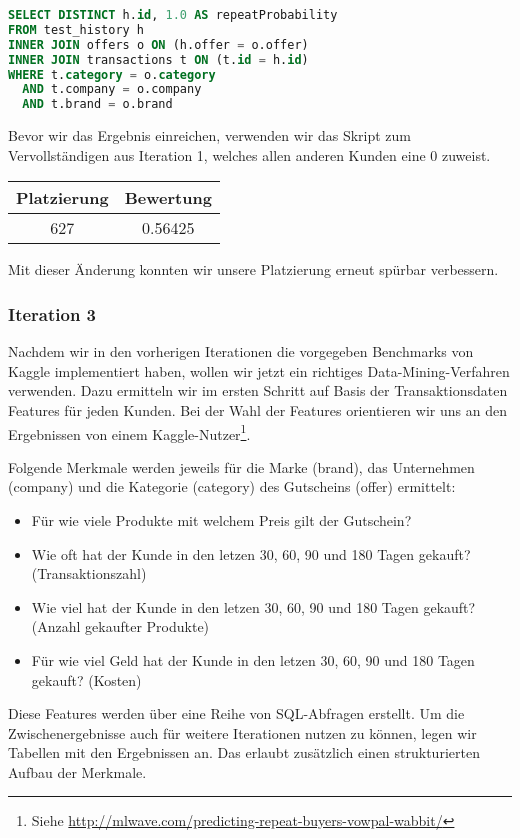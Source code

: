 \begin{lstlisting}[language=SQL]
SELECT DISTINCT h.id, 1.0 AS repeatProbability
FROM test_history h 
INNER JOIN offers o ON (h.offer = o.offer)
INNER JOIN transactions t ON (t.id = h.id)
WHERE t.category = o.category
  AND t.company = o.company
  AND t.brand = o.brand
\end{lstlisting}

Bevor wir das Ergebnis einreichen, verwenden wir das Skript zum Vervollständigen aus Iteration 1, welches allen anderen Kunden eine 0 zuweist.

\begin{tabular}{|c|c|}
	\hline \textbf{Platzierung} & \textbf{Bewertung} \\ 
	\hline 627 & 0.56425  \\ 
	\hline 
\end{tabular}

Mit dieser Änderung konnten wir unsere Platzierung erneut spürbar verbessern.

\subsubsection{Iteration 3}

Nachdem wir in den vorherigen Iterationen die vorgegeben Benchmarks von Kaggle implementiert haben,
wollen wir jetzt ein richtiges Data-Mining-Verfahren verwenden. Dazu ermitteln wir im ersten Schritt
auf Basis der Transaktionsdaten Features für jeden Kunden. Bei der Wahl der Features orientieren
wir uns an den Ergebnissen von einem Kaggle-Nutzer\footnote{Siehe \url{http://mlwave.com/predicting-repeat-buyers-vowpal-wabbit/}}.

Folgende Merkmale werden jeweils für die Marke (brand), das Unternehmen (company) und die Kategorie (category)
des Gutscheins (offer) ermittelt:
\begin{itemize}
	\item Für wie viele Produkte mit welchem Preis gilt der Gutschein?
	\item Wie oft hat der Kunde in den letzen 30, 60, 90 und 180 Tagen gekauft? (Transaktionszahl)
	\item Wie viel hat der Kunde in den letzen 30, 60, 90 und 180 Tagen gekauft? (Anzahl gekaufter Produkte)
	\item Für wie viel Geld hat der Kunde in den letzen 30, 60, 90 und 180 Tagen gekauft? (Kosten)
\end{itemize}

Diese Features werden über eine Reihe von SQL-Abfragen erstellt. Um die Zwischenergebnisse auch für
weitere Iterationen nutzen zu können, legen wir Tabellen mit den Ergebnissen an. Das erlaubt zusätzlich
einen strukturierten Aufbau der Merkmale.


